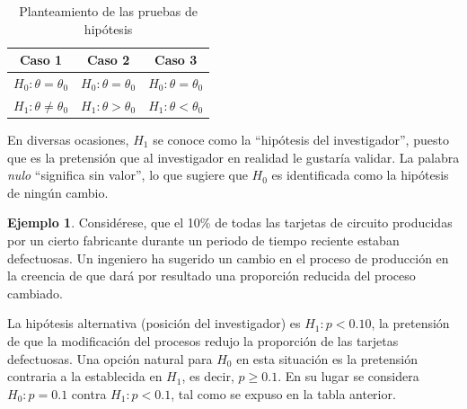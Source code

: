 \documentclass[
  11pt,
]{book}
\theoremstyle{definition}
\theoremstyle{definition}
\newtheorem{example}{Ejemplo}[chapter]
\theoremstyle{definition}
\theoremstyle{definition}
\theoremstyle{remark}
\begin{document}
\begin{table}[H]
\centering
\caption{\label{tab:hipotesis}Planteamiento de las pruebas de hipótesis}
\centering
\begin{tabular}[t]{ccc}
\toprule
Caso 1 & Caso 2 & Caso 3\\
\midrule
$H_0: \theta = \theta_0$ & $H_0: \theta = \theta_0$ & $H_0: \theta = \theta_0$\\
$H_1: \theta \neq \theta_0$ & $H_1: \theta > \theta_0$ & $H_1:\theta < \theta_0$\\
\bottomrule
\end{tabular}
\end{table}

En diversas ocasiones, \(H_1\) se conoce como la ``hipótesis del investigador'', puesto que es la pretensión que al investigador en realidad le gustaría validar. La palabra \emph{nulo} ``significa sin valor'', lo que sugiere que \(H_0\) es identificada como la hipótesis de ningún cambio.

\begin{example}
Considérese, que el 10\% de todas las tarjetas de circuito producidas por un cierto fabricante durante un periodo de tiempo reciente estaban defectuosas. Un ingeniero ha sugerido un cambio en el proceso de producción en la creencia de que dará por resultado una proporción reducida del proceso cambiado.

La hipótesis alternativa (posición del investigador) es \(H_1: p <0.10\), la pretensión de que la modificación del procesos redujo la proporción de las tarjetas defectuosas. Una opción natural para \(H_0\) en esta situación es la pretensión contraria a la establecida en \(H_1\), es decir, \(p\geq 0.1\). En su lugar se considera \(H_0: p = 0.1\) contra \(H_1: p < 0.1\), tal como se expuso en la tabla anterior.
\end{example}
\end{document}
